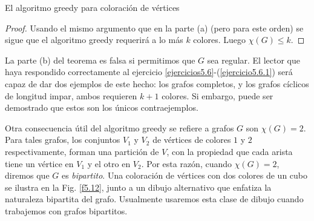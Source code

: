 \begin{section}{El algoritmo greedy para coloración de vértices}
\begin{proof}
Usando el mismo argumento que en la parte (a) (pero para este
orden) se sigue que el algoritmo greedy requerirá a lo más $k$
colores. Luego $\chi(G)\le k$.
\end{proof}

La parte (b) del teorema es falsa si permitimos que $G$ sea
regular. El lector que haya respondido correctamente al ejercicio
\ref{ejercicios5.6}-(\ref{ejercicio5.6.1}) será capaz de dar dos
ejemplos de este hecho: los grafos completos, y los grafos
cíclicos de longitud impar, ambos requieren $k+1$ colores. Si
embargo, puede ser demostrado que estos son los únicos
contraejemplos.

Otra consecuencia útil del algoritmo greedy se refiere a grafos
$G$ son $\chi(G)=2$. Para tales grafos, los conjuntos $V_1$ y
$V_2$ de vértices de colores $1$ y $2$ respectivamente, forman una
partición de $V$, con la propiedad que cada arista tiene un
vértice en $V_1$ y el otro en $V_2$. Por esta razón, cuando
$\chi(G)=2$, diremos que $G$ es {\em bipartito}.
Una coloración de vértices con dos colores de un cubo se ilustra
en la Fig. \ref{f5.12}, junto a un dibujo alternativo que enfatiza
la naturaleza bipartita del grafo. Usualmente usaremos esta clase
de dibujo cuando trabajemos con grafos bipartitos.


\end{section}
